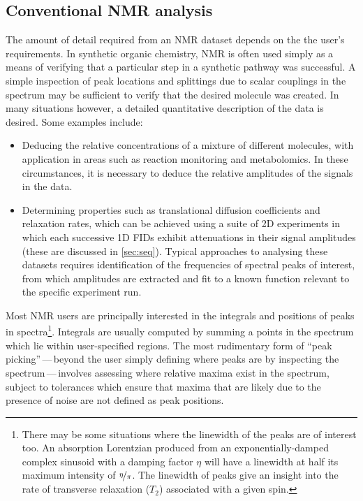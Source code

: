 \subsection{Conventional \acs{NMR} analysis}
The amount of detail required from an \ac{NMR} dataset depends on the
the user's requirements. In synthetic organic chemistry, \ac{NMR} is often used
simply as a means of verifying that a particular step in a synthetic pathway
was successful. A simple inspection of peak locations and splittings due to
scalar couplings in the spectrum may be sufficient to verify that the desired
molecule was created. In many situations however, a detailed quantitative
description of the data is desired. Some examples include:
\begin{itemize}
    \item Deducing the relative concentrations of a mixture of different
        molecules, with application in areas such as reaction
        monitoring\cite{Bernstein2016} and metabolomics\cite{Emwas2019}.
        In these circumstances, it is necessary to deduce the relative
        amplitudes of the signals in the data.
    \item Determining properties such as translational diffusion coefficients
        and relaxation rates, which can be achieved using a suite of \ac{2D}
        experiments in which each successive \ac{1D} \acp{FID} exhibit
        attenuations in their signal amplitudes (these are discussed in
        \cref{sec:seq}).  Typical approaches to analysing these datasets
        requires identification of the frequencies of spectral peaks of
        interest, from which amplitudes are extracted and fit to a known
        function relevant to the specific experiment run.
\end{itemize}

Most \ac{NMR} users are principally interested in the integrals and positions
of peaks in spectra\footnote{
    There may be some situations where the linewidth of the peaks are of
    interest too. An absorption Lorentzian produced from an
    exponentially-damped complex sinusoid with a damping factor $\eta$ will
    have a linewidth at half its maximum intensity of $\nicefrac{\eta}{\pi}$.
    The linewidth of peaks give an insight into the rate of transverse
    relaxation ($T_2$) associated with a given spin.
}.
Integrals are usually computed by summing a points in the spectrum which lie
within user-specified regions.
The most rudimentary form of ``peak picking''\,---\,beyond the user
simply defining where peaks are by inspecting the spectrum\,---\,involves
assessing where relative maxima exist in the spectrum, subject to
tolerances which ensure that maxima that are likely due to the presence of
noise are not defined as peak positions.


